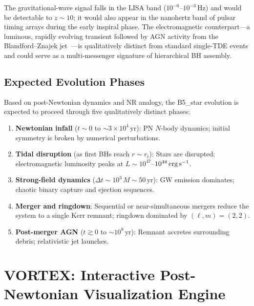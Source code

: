 \documentclass[aps,prd,twocolumn,superscriptaddress,nofootinbib,showpacs,
               longbibliography]{revtex4-2}
\begin{document}
The gravitational-wave signal falls in the LISA band
($10^{-6}$--$10^{-3}$\,Hz) and would be detectable to $z \sim 10$; it
would also appear in the nanohertz band of pulsar timing arrays during the
early inspiral phase.
The electromagnetic counterpart---a luminous, rapidly evolving transient
followed by AGN activity from the Blandford--Znajek
jet~\cite{BlandfordZnajek1977}---is qualitatively distinct from standard
single-TDE events and could serve as a multi-messenger signature of
hierarchical BH assembly.

\subsection{Expected Evolution Phases}
\label{sec:b5_phases}

Based on post-Newtonian dynamics and NR analogy, the B5\_star evolution is
expected to proceed through five qualitatively distinct phases:
\begin{enumerate}[nosep]
  \item \textbf{Newtonian infall} ($t \sim 0$ to ${\sim}3\times10^4\,\text{yr}$):
    PN $N$-body dynamics; initial symmetry is broken by numerical perturbations.
  \item \textbf{Tidal disruption} (as first BHs reach $r \sim r_t$):
    Stars are disrupted; electromagnetic luminosity peaks at
    $L \sim 10^{47}$--$10^{48}\,\text{erg\,s}^{-1}$.
  \item \textbf{Strong-field dynamics}
    ($\Delta t \sim 10^3\,M \sim 50\,\text{yr}$):
    GW emission dominates; chaotic binary capture and ejection sequences.
  \item \textbf{Merger and ringdown}:
    Sequential or near-simultaneous mergers reduce the system to a single
    Kerr remnant; ringdown dominated by $(\ell,m) = (2,2)$.
  \item \textbf{Post-merger AGN} ($t \gtrsim 0$ to ${\sim}10^8\,\text{yr}$):
    Remnant accretes surrounding debris; relativistic jet launches.
\end{enumerate}

\section{VORTEX: Interactive Post-Newtonian Visualization Engine}
\label{sec:vortex}
\end{document}
